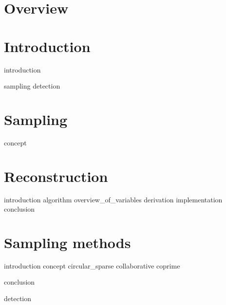 \documentclass[a4paper, openany, oneside]{memoir}
\begin{document}
\chapter{Overview}

\chapter{Introduction}
{introduction}

{sampling}
{detection}


\chapter{Sampling}
\label{cha:sampling}

{concept}


\chapter{Reconstruction}
\label{cha:reconstruction}

{introduction}
{algorithm}
{overview_of_variables}
{derivation}
{implementation}
{conclusion}

\chapter{Sampling methods}
\label{cha:sampling_methods}

{introduction}
{concept}
{circular_sparse}
{collaborative}
{coprime}

{conclusion}


{detection}
\end{document}
